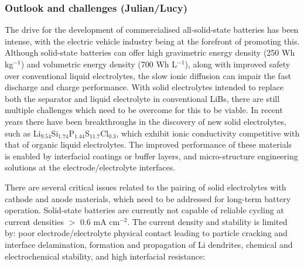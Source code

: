 \documentclass[../main.tex]{subfiles}
\begin{document}
\subsubsection{Outlook and challenges (Julian/Lucy)}
\label{sec:outlook_electrolytes}
The drive for the development of commercialised all-solid-state batteries has been intense, with the electric vehicle industry being at the forefront of promoting this.\cite{Woods_2021} Although solid-state batteries can offer high gravimetric energy density (250 Wh kg$^{-1}$) and volumetric energy density (700 Wh L$^{-1}$), along with improved safety over conventional liquid electrolytes, the slow ionic diffusion can impair the fast discharge and charge performance. With solid electrolytes intended to replace both the separator and liquid electrolyte in conventional LiBs, \cite{schnell2020solid} there are still multiple challenges which need to be overcome for this to be viable. In recent years there have been breakthroughs in the discovery of new solid electrolytes, such as Li$_{9.54}$Si$_{1.74}$P$_{1.44}$S$_{11.7}$Cl$_{0.3}$, \cite{kato2016high} which exhibit ionic conductivity competitive with that of organic liquid electrolytes. The improved performance of these materials is enabled by interfacial coatings or buffer layers, and micro-structure engineering solutions at the electrode/electrolyte interfaces.  \cite{kim2021solid}

There are several critical issues related to the pairing of solid electrolytes with cathode and anode materials, which need to be addressed for long-term battery operation. Solid-state batteries are currently not capable of reliable cycling at current densities $>$ 0.6 mA cm$^{-2}$\cite{famprikis_fundamentals_2019, Albertus2018}. The current density and stability is limited by: poor electrode/electrolyte physical contact leading to particle cracking and interface delamination, formation and propagation of Li dendrites, chemical and electrochemical stability, and high interfacial resistance: \cite{famprikis_fundamentals_2019} 
\end{document}
